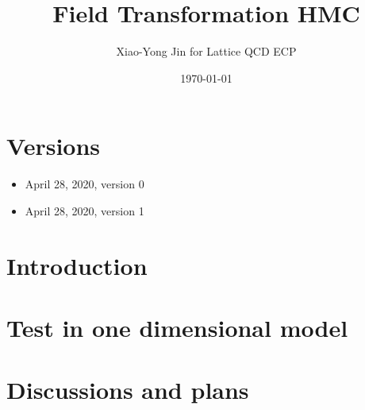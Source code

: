 


\author{Xiao-Yong Jin for Lattice QCD ECP}
\date{\today}
\title{Field Transformation HMC}


\maketitle
\tableofcontents

\section*{Versions}
\label{sec:versions}

\begin{itemize}
\item April 28, 2020, version 0
\item April 28, 2020, version 1
\end{itemize}

\section{Introduction}
\label{sec:intro}


\section{Test in one dimensional model}
\label{sec:test-1d}


\section{Discussions and plans}
\label{sec:discuss-plans}


\ifdefined\directlua
  \printbibliography
\else
  
  
\fi


